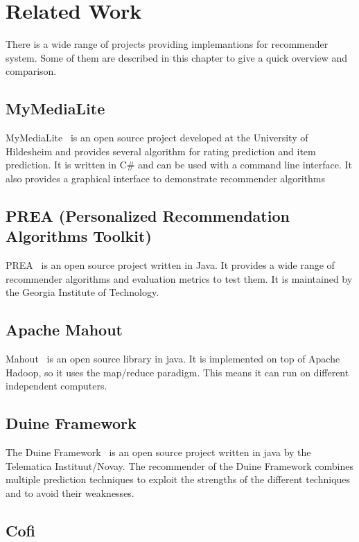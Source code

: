 
\chapter{Related Work}
\label{relatedwork}

There is a wide range of projects providing implemantions for recommender
system. Some of them are described in this chapter to give a quick
overview and comparison.


\section{MyMediaLite}

MyMediaLite~\cite{Gantner2011MyMediaLite} is an open source project developed at the
University of Hildesheim and provides several algorithm for rating
prediction and item prediction. It is written in C\# and can be used with
a command line interface. It also provides a graphical interface to
demonstrate recommender algorithms


\section{PREA (Personalized Recommendation Algorithms Toolkit)}

PREA~\cite{2012arXiv1205.3193L} is an open source project written in Java. It provides
a wide range of recommender algorithms and evaluation metrics to test
them. It is maintained by the Georgia Institute of Technology.


\section{Apache Mahout}

Mahout~\cite{mahout} is an open source library in java. It is implemented
on top of Apache Hadoop, so it uses the map/reduce paradigm. This
means it can run on different independent computers.


\section{Duine Framework}

The Duine Framework~\cite{duine} is an open source project written
in java by the Telematica Instituut/Novay. The recommender of the
Duine Framework combines multiple prediction techniques to exploit
the strengths of the different techniques and to avoid their weaknesses.


\section{Cofi}


